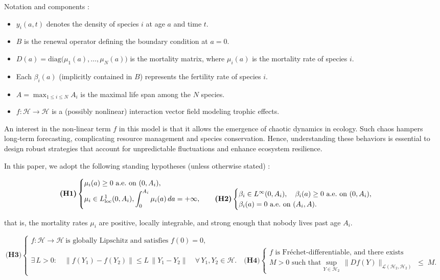 \documentclass[10pt, a4paper]{amsart}
\theoremstyle{plain}
\theoremstyle{definition}
\theoremstyle{remark}
\numberwithin{equation}{section}
\def\to{\rightarrow}
\begin{document}
Notation and components :
\begin{itemize} 
\item \(y_i(a,t)\) denotes the density of species \(i\) at age \(a\) and time \(t\).  
\item \(B\) is the  renewal operator defining the boundary condition at \(a=0\).  
\item \(D(a)=\mathrm{diag}\bigl(\mu_1(a),\dots,\mu_N(a)\bigr)\) is the mortality matrix, where \(\mu_i(a)\) is the mortality rate of species \(i\).  
\item Each \(\beta_i(a)\) (implicitly contained in \(B\)) represents the fertility rate of species \(i\).  
\item \(A=\max_{1\le i\le N}A_i\) is the maximal life span among the \(N\) species.  
\item \(f:\mathcal H\to\mathcal H\) is a (possibly nonlinear) interaction vector field modeling trophic effects.
\end{itemize}




An interest in the non‑linear term $f$ in this model is that it allows the emergence of chaotic dynamics in ecology. Such chaos hampers long‑term forecasting, complicating resource management and species conservation. Hence, understanding these behaviors is essential to design robust strategies that account for unpredictable fluctuations and enhance ecosystem resilience.

In this paper, we adopt the following standing hypotheses (unless otherwise stated) :

$$
\textbf{(H1)}\begin{cases}
\mu_i(a)\geq 0\ \text{a.e.\ on }(0,A_i),\\
\displaystyle\mu_i\in L^1_{\rm loc}(0,A_i),\int_0^{A_i}\mu_i(a)\,da=+\infty,\quad \quad\textbf{(H2)}\begin{cases}
\beta_i\in L^\infty(0,A_i),\quad \beta_i(a)\ge0\ \text{a.e.\ on } (0,A_i),\\
\beta_i(a)=0\ \text{a.e.\ on }(A_i,A).
\end{cases}
\end{cases}
$$

that is, the mortality rates $\mu_i$ are positive, locally integrable, and strong enough that nobody lives past age $A_i$.

$$
\textbf{(H3)}\begin{cases}
f:\mathcal H\to\mathcal H\ \text{is globally Lipschitz and satisfies }f(0)=0,
\\
\exists\,L>0:\quad
\|f(Y_1)-f(Y_2)\|\le L\,\|Y_1-Y_2\|
\quad\forall\,Y_1,Y_2\in\mathcal H.\quad\textbf{(H4)}\begin{cases}
f
\text{ is Fréchet‐differentiable, and there exists}\\
M>0\text{ such that} \displaystyle
\sup_{Y\in\mathcal{H}_2}\,\bigl\|Df(Y)\bigr\|_{\mathcal{L}(\mathcal{H}_2,\mathcal{H}_2)}
\;\le\;M.
\end{cases}
\end{cases}
$$
\end{document}
